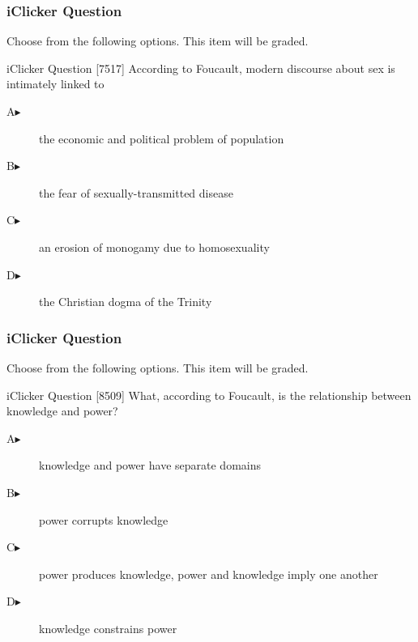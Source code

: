 \documentclass[xcolor=dvipsnames]{beamer}
\begin{document}
\begin{frame}
  \frametitle{iClicker Question}
Choose from the following options. This item will be graded.
\begin{block}{iClicker Question}
[7517] According to Foucault, modern discourse about sex is intimately linked to
\end{block}
\begin{description}
\item[A\hspace{.2in}$\blacktriangleright$] the economic and political problem of population
\item[B\hspace{.2in}$\blacktriangleright$] the fear of sexually-transmitted disease
\item[C\hspace{.2in}$\blacktriangleright$] an erosion of monogamy due to homosexuality
\item[D\hspace{.2in}$\blacktriangleright$] the Christian dogma of the Trinity
\end{description}
\end{frame}


\begin{frame}
  \frametitle{iClicker Question}
Choose from the following options. This item will be graded.
\begin{block}{iClicker Question}
[8509] What, according to Foucault, is the relationship between knowledge and power?
\end{block}
\begin{description}
\item[A\hspace{.2in}$\blacktriangleright$] knowledge and power have separate domains
\item[B\hspace{.2in}$\blacktriangleright$] power corrupts knowledge
\item[C\hspace{.2in}$\blacktriangleright$] power produces knowledge, power and knowledge imply one another
\item[D\hspace{.2in}$\blacktriangleright$] knowledge constrains power
\end{description}
\end{frame}
\end{document}
